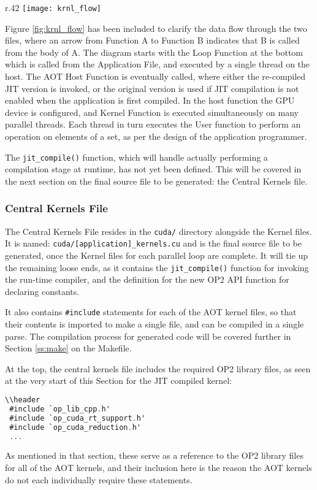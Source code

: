 \begin{wrapfigure}{r}{.42\textwidth}
  \centering
  \texttt{[image: krnl\_flow]}
  \caption{Kernel Flow}
  \label{fig:krnl_flow}
\end{wrapfigure}

Figure \ref{fig:krnl_flow} has been included to clarify the data flow through the two files, where an arrow from Function A to Function B indicates that B is called from the body of A. The diagram starts with the Loop Function at the bottom which is called from the Application File, and executed by a single thread on the host. The AOT Host Function is eventually called, where either the re-compiled JIT version is invoked, or the original version is used if JIT compilation is not enabled when the application is first compiled. In the host function the GPU device is configured, and Kernel Function is executed simultaneously on many parallel threads. Each thread in turn executes the User function to perform an operation on elements of a set, as per the design of the application programmer.

The \verb|jit_compile()| function, which will handle actually performing a compilation stage at runtime, has not yet been defined. This will be covered in the next section on the final source file to be generated: the Central Kernels file.
\clearpage
\subsubsection{Central Kernels File}
\label{sss:mkf}
The Central Kernels File resides in the \verb|cuda/| directory alongside the Kernel files. It is named: \verb|cuda/[application]_kernels.cu| and is the final source file to be generated, once the Kernel files for each parallel loop are complete. It will tie up the remaining loose ends, as it contains the \verb|jit_compile()| function for invoking the run-time compiler, and the definition for the new OP2 API function for declaring constants.
\par It also contains \verb|#include| statements for each of the AOT kernel files, so that their contents is imported to make a single file, and can be compiled in a single parse. The compilation process for generated code will be covered further in Section \ref{ss:make} on the Makefile.
\par
At the top, the central kernels file includes the required OP2 library files, as seen at the very start of this Section for the JIT compiled kernel:
\begin{lstlisting}[backgroundcolor = \color{red!20}, language=C]
\\header
 #include `op_lib_cpp.h'
 #include `op_cuda_rt_support.h'
 #include `op_cuda_reduction.h'
 ...
\end{lstlisting}
As mentioned in that section, these serve as a reference to the OP2 library files for all of the AOT kernels, and their inclusion here is the reason the AOT kernels do not each individually require these statements.

